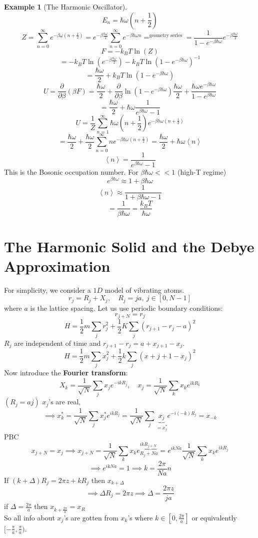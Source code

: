 \documentclass[11pt]{book}
\theoremstyle{definition}
\newtheorem{example}{Example}[section]
\begin{document}
\begin{example}[The Harmonic Oscillator]
\[ E_n = \hbar \omega(n+ \frac{1}{2}) \] 
\[ Z = \sum_{n=0}^{\infty}e^{-\beta \omega (n+ \frac{1}{2})} 
= e^{-\beta \frac{\hbar \omega}{2}} \sum_{n=0}^{\infty} e^{-\beta \hbar \omega n} =^{\text{geometry series}} = \frac{1}{1-e^{-\beta \hbar \omega}} e^{-\beta \frac{\hbar \omega}{2}}\] 
\[ F = -k_BT\ln(Z)  \] 
\[ = -k_B T\ln(e^{-\beta \frac{\hbar \omega}{2}}) - k_B T\ln(1-e^{-\beta \hbar \omega})^{-1}   \] 
\[ =\frac{\hbar \omega}{2} + k_BT \ln(1-e^{-\beta \hbar \omega}) \] 
\[ U = \frac{\partial }{\partial \beta} (\beta F) = \frac{\hbar \omega}{2} + \frac{\partial }{\partial \beta} \ln(1-e^{-\beta \hbar \omega}) 
\frac{\hbar \omega}{2} + \frac{\hbar \omega e^{-\beta \hbar \omega}}{1-e^{\beta \hbar \omega}}\] 
\[ = \frac{\hbar \omega}{2} + \hbar \omega \frac{1}{e^{\beta \hbar \omega}-1} \] 
\[ U = \frac{1}{Z}\sum_{n=1}^{\infty} \hbar \omega (n + \frac{1}{2}) e^{-\beta h \omega (n+ \frac{1}{2})} \] 
\[ = \frac{\hbar \omega}{2} + \frac{\hbar \omega}{2} \sum_{n=0}^{\infty} n e^{-\beta \hbar \omega (n+ \frac{1}{2})} = \frac{\hbar \omega}{2}+\hbar \omega \left \langle n \right \rangle  \] 
\[ \left \langle n \right \rangle = \frac{1}{e^{\beta \hbar \omega}-1} \] 
This is the Bosonic occupation number.
For $ \beta \hbar \omega << 1 $ (high-T regime)
\[ e^{\beta \hbar \omega} \approx 1 + \beta \hbar \omega \] 
\[ \left \langle n \right \rangle \approx \frac{1}{1+\beta \hbar \omega -1} \]
\[= \frac{1}{\beta \hbar \omega} 
= \frac{k_BT}{\hbar \omega} \] 
\end{example}

\section{The Harmonic Solid and the Debye Approximation}
For simplicity, we consider a $ 1D $ model of vibrating atoms. 
\[ r_j = R_j + X_j, \quad R_j = ja, \: j \in [0, N-1]\] where $ a $ is the lattice spacing.
Let us use periodic boundary conditions:
\[ r_{j+N} = r_j \] 
\[ H = \frac{1}{2}m \sum_{j} \dot r_j ^2 + \frac{1}{2} K \sum_j(r_{j+1}-r_j-a)^2 \] 
$ R_j $ are independent of time and $ r_{j+1}-r_j = a + x_{j+1} - x_j$.
\[ H = \frac{1}{2}m \sum_j \dot x_j^2 + \frac{1}{2}k \sum_j (x+{j+1}-x_j)^2 \] 
Now introduce the \textbf{Fourier transform}:
\[ X_k  = \frac{1}{\sqrt{N}}  \sum_j x_j e^{-ikR_j},\quad
x_j = \frac{1}{\sqrt{N}} \sum_k x_k e^{ikR_k}\] 
$ (R_j = aj) $ 
$ x_j $'s are real,
\[ \implies x_k^{*} = \frac{1}{\sqrt{N}} \sum_j x_j^{*} e^{ikR_j}
= \frac{1}{\sqrt{N}} \sum_j \underbrace{x_j}_{=x_j^{*}} e^{-i(-k)R_j} = x_{-k}\] 
PBC
\[ x_{j+N} = x_j \implies x_{j+N} = \frac{1}{\sqrt{N}} \sum_k x_k e^{ik\underbrace{R_{j+N}}}_{R_j+Na} = e^{ikNa}\frac{1}{\sqrt{N}} \sum_k x_k e^{ikR_j}\] 
\[ \implies e^{ikNa} = 1 \implies k = \frac{2\pi}{Na}n \] 
If $ (k+\Delta)R_j = 2\pi z + kR_j $ then $ x_{k+\Delta} $ 
\[ \implies \Delta R_j = 2 \pi z \implies \Delta = \frac{2\pi z}{ja} \] 
if $ \Delta = \frac{2\pi}{a} $ then $ x_{k+\frac{2\pi}{a}} = x_R $  \\
So all info about $ x_j $'s are gotten from $ x_k $'s where $ k \in [0, \frac{2\pi}{a}] $ or equivalently $  [-\frac{\pi}{a}, \frac{\pi}{a})$. \\
\end{document}
